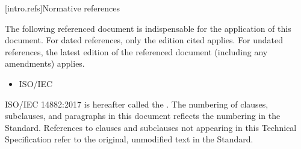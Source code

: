 
[intro.refs]{Normative references}

\pnum

 The following referenced document is indispensable for the
 application of this document. For dated references, only the
 edition cited applies. For undated references, the latest edition
 of the referenced document (including any amendments) applies.

 \begin{itemize}
 \item ISO/IEC 
 \end{itemize}

ISO/IEC 14882:2017 is hereafter called the .
 The numbering of clauses, subclauses, and paragraphs in this document
 reflects the numbering in the \Cpp Standard. References to clauses
 and subclauses not appearing in this Technical Specification refer to
 the original, unmodified text in the \Cpp Standard.


